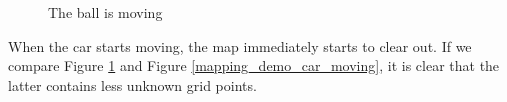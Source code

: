 \begin{figure}[!ht]
    \centering
    \caption{The ball is moving}
    \label{mapping_demo_ball_moving}
\end{figure}

When the car starts moving, the map immediately starts to clear out. If we compare Figure \ref{mapping_demo_ball_moving} and Figure \ref{mapping_demo_car_moving}, it is clear that the latter contains less unknown grid points.

